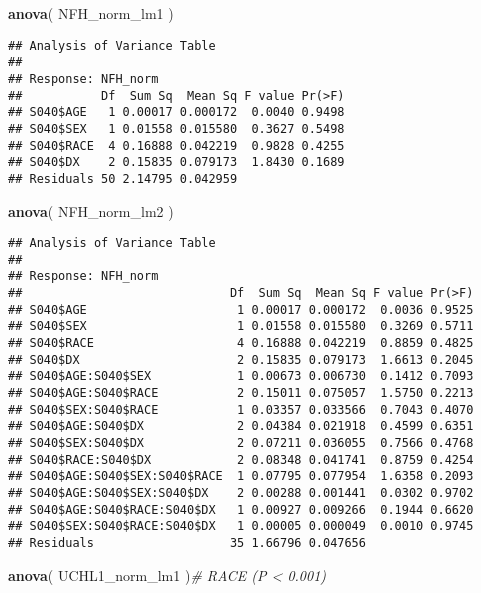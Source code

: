 \documentclass[]{article}
\newenvironment{Shaded}{\begin{snugshade}}{\end{snugshade}}
\newcommand{\CommentTok}[1]{\textcolor[rgb]{0.56,0.35,0.01}{\textit{#1}}}
\newcommand{\KeywordTok}[1]{\textcolor[rgb]{0.13,0.29,0.53}{\textbf{#1}}}
\newcommand{\NormalTok}[1]{#1}
\begin{document}
\begin{Shaded}
\begin{Highlighting}[]
\KeywordTok{anova}\NormalTok{(  NFH_norm_lm1    )}
\end{Highlighting}
\end{Shaded}

\begin{verbatim}
## Analysis of Variance Table
## 
## Response: NFH_norm
##           Df  Sum Sq  Mean Sq F value Pr(>F)
## S040$AGE   1 0.00017 0.000172  0.0040 0.9498
## S040$SEX   1 0.01558 0.015580  0.3627 0.5498
## S040$RACE  4 0.16888 0.042219  0.9828 0.4255
## S040$DX    2 0.15835 0.079173  1.8430 0.1689
## Residuals 50 2.14795 0.042959
\end{verbatim}

\begin{Shaded}
\begin{Highlighting}[]
\KeywordTok{anova}\NormalTok{(  NFH_norm_lm2    )}
\end{Highlighting}
\end{Shaded}

\begin{verbatim}
## Analysis of Variance Table
## 
## Response: NFH_norm
##                             Df  Sum Sq  Mean Sq F value Pr(>F)
## S040$AGE                     1 0.00017 0.000172  0.0036 0.9525
## S040$SEX                     1 0.01558 0.015580  0.3269 0.5711
## S040$RACE                    4 0.16888 0.042219  0.8859 0.4825
## S040$DX                      2 0.15835 0.079173  1.6613 0.2045
## S040$AGE:S040$SEX            1 0.00673 0.006730  0.1412 0.7093
## S040$AGE:S040$RACE           2 0.15011 0.075057  1.5750 0.2213
## S040$SEX:S040$RACE           1 0.03357 0.033566  0.7043 0.4070
## S040$AGE:S040$DX             2 0.04384 0.021918  0.4599 0.6351
## S040$SEX:S040$DX             2 0.07211 0.036055  0.7566 0.4768
## S040$RACE:S040$DX            2 0.08348 0.041741  0.8759 0.4254
## S040$AGE:S040$SEX:S040$RACE  1 0.07795 0.077954  1.6358 0.2093
## S040$AGE:S040$SEX:S040$DX    2 0.00288 0.001441  0.0302 0.9702
## S040$AGE:S040$RACE:S040$DX   1 0.00927 0.009266  0.1944 0.6620
## S040$SEX:S040$RACE:S040$DX   1 0.00005 0.000049  0.0010 0.9745
## Residuals                   35 1.66796 0.047656
\end{verbatim}

\begin{Shaded}
\begin{Highlighting}[]
\KeywordTok{anova}\NormalTok{(  UCHL1_norm_lm1  )}\CommentTok{# RACE (P < 0.001)}
\end{Highlighting}
\end{Shaded}
\end{document}
